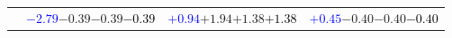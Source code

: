 \documentclass[compress]{beamer}
\begin{document}
\begin{frame}
\begin{tabular}{r | c | c | c}
          & \textcolor{blue}{$-2.79$}\hspace{0.1 cm}$-0.39$\hspace{0.1 cm}$-0.39$\hspace{0.1 cm}\textcolor{black}{$-0.39$} & \textcolor{blue}{$+0.94$}\hspace{0.1 cm}$+1.94$\hspace{0.1 cm}$+1.38$\hspace{0.1 cm}\textcolor{black}{$+1.38$} & \textcolor{blue}{$+0.45$}\hspace{0.1 cm}$-0.40$\hspace{0.1 cm}$-0.40$\hspace{0.1 cm}\textcolor{black}{$-0.40$} \\
\end{tabular}
\end{frame}
\end{document}
